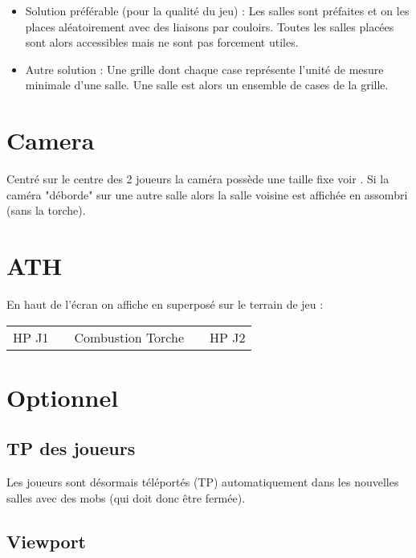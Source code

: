 \begin{itemize}
\item Solution préférable (pour la qualité du jeu) :
Les salles sont préfaites et on les places aléatoirement avec des liaisons par couloirs. Toutes les salles placées sont alors accessibles mais ne sont pas forcement utiles.

\item Autre solution :
Une grille dont chaque case représente l'unité de mesure minimale d'une salle. Une salle est alors un ensemble de cases de la grille.
\end{itemize}

\section{Camera}

Centré sur le centre des 2 joueurs la caméra possède une taille fixe voir . Si la caméra "déborde" sur une autre salle alors la salle voisine est affichée en assombri (sans la torche).

\section{ATH}

En haut de l'écran on affiche en superposé sur le terrain de jeu :

\begin{center}
\begin{tabular}{l|p{2cm}|c|p{2cm}|r}
HP J1 & & Combustion Torche & & HP J2 \\
\end{tabular}
\end{center}

\section{Optionnel}

\subsection*{TP des joueurs}
\label{subsec:TP}

Les joueurs sont désormais téléportés (TP) automatiquement dans les nouvelles salles avec des mobs (qui doit donc être fermée).

\subsection*{Viewport}
\label{subsec:Viewport}

